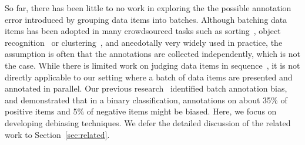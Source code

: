 So far, there has been little to no work in exploring the 
the possible annotation error introduced by grouping 
data items into batches.
Although batching data items has been adopted in many crowdsourced tasks such as
sorting~\cite{marcus:vldb2011}, object recognition~\cite{su:aaai2012} or clustering~\cite{gomes:nips2011}, 
and anecdotally very widely used in practice,   
the assumption is often 
that the annotations are collected independently, which is not the case.
While there is limited work on judging data items in sequence~\cite{mozer:nips2010,scholer:sigir2013,scholer:sigir2011},
it is not directly applicable to our setting where a batch of data items are presented and annotated in parallel.
Our previous research~\cite{zhuang:wsdm2015} identified batch annotation bias, 
and demonstrated that in a binary classification, annotations on about 35\% of positive items and 5\% of negative items might be biased.  
Here, we focus on developing debiasing techniques.  
We defer the detailed discussion of the related work to Section~\ref{sec:related}.



